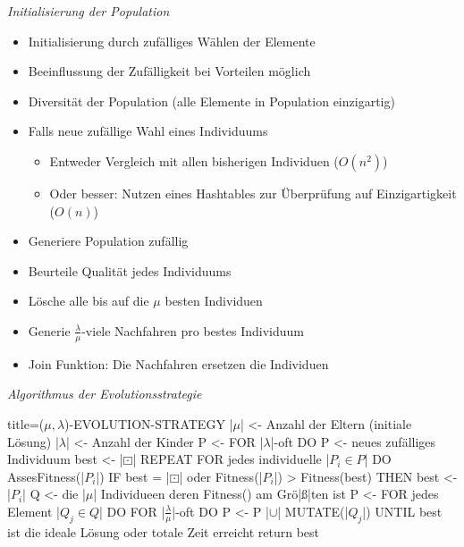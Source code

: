 \documentclass[
    ngerman,
    color=3b,
    load_common, %
    summary,
    boxarc,
]{rubos-tuda-template}
\begin{document}
\textit{Initialisierung der Population}
\begin{itemize}
    \item Initialisierung durch zufälliges Wählen der Elemente
    \item Beeinflussung der Zufälligkeit bei Vorteilen möglich
    \item Diversität der Population (alle Elemente in Population einzigartig)
    \item Falls neue zufällige Wahl eines Individuums
          \begin{itemize}
              \item Entweder Vergleich mit allen bisherigen Individuen ($O(n^2)$)
              \item Oder besser: Nutzen eines Hashtables zur Überprüfung auf Einzigartigkeit ($O(n)$)
          \end{itemize}
\end{itemize}
\clearpage
\begin{idea}[Evolutionsstrategie]\mbox{}
    \begin{itemize}
        \item Generiere Population zufällig
        \item Beurteile Qualität jedes Individuums
        \item Lösche alle bis auf die $\mu$ besten Individuen
        \item Generie $\frac{\lambda}{\mu}$-viele Nachfahren pro bestes Individuum
        \item Join Funktion: Die Nachfahren ersetzen die Individuen
    \end{itemize}
\end{idea}

\textit{Algorithmus der Evolutionsstrategie}

\begin{codeBlock}[autogobble,escapeinside=||]{title={($\mu, \lambda$)-EVOLUTION-STRATEGY}}
    |$\mu$| <- Anzahl der Eltern (initiale Lösung)
    |$\lambda$| <- Anzahl der Kinder
    P <- {}
    FOR |$\lambda$|-oft DO
        P <- {neues zufälliges Individuum}
    best <- |$\boxdot$|
    REPEAT
        FOR jedes individuelle |$P_i \in P$| DO
            AssesFitness(|$P_i$|)
            IF best = |$\boxdot$| oder Fitness(|$P_i$|) > Fitness(best) THEN
                best <- |$P_i$|
        Q <- die |$\mu$| Individueen deren Fitness() am Grö|\ss{}|ten ist
        P <- {}
        FOR jedes Element |$Q_j \in Q$| DO
            FOR |$\frac{\lambda}{\mu}$|-oft DO
                P <- P |$\cup$| {MUTATE(|$Q_j$|)}
    UNTIL best ist die ideale Lösung oder totale Zeit erreicht
    return best
\end{codeBlock}
\end{document}
